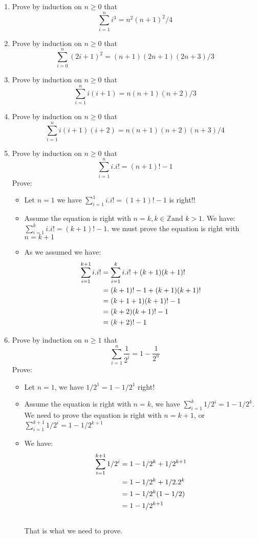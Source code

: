 \documentclass[11pt]{article}
\begin{document}
\begin {enumerate}
\item Prove by induction on $n \geq 0$ that $$\sum_{i=1}^n i^3 = n^2(n+1)^2/4$$
\item Prove by induction on $n \geq 0$ that $$\sum_{i=0}^n (2i+1)^2 =
  (n+1)(2n+1)(2n+3)/3$$
\item Prove by induction on $n \geq 0$ that $$\sum_{i=1}^ni(i+1) =
  n(n+1)(n+2)/3 $$
\item Prove by induction on $n \geq 0$ that $$
\sum_{i=1}^n i(i+1)(i+2) = n(n+1)(n+2)(n+3)/4$$

\item Prove by induction on $n \geq 0$ that $$
\sum_{i=1}^ni.i! = (n+1)! -1
$$
Prove:
\begin{itemize}
\item  Let $n = 1$ we have $\sum_{i=1}^1i.i! = (1+1)!-1$ is right!!
\item Assume the equation is right with $n=k, k\in \mathbb{Z} \mbox{
    and } k >1$. We have: $\sum_{i=1}^k i.i! = (k+1)!-1$. we must prove the equation is right with $n = k+1$
\item As we assumed we have:
\begin{align}
\sum_{i=1}^{k+1}i.i! &= \sum_{i=1}^{k}i.i! + (k+1)(k+1)! \\ \notag
&= (k+1)! -1 + (k+1)(k+1)!\\ \notag
&= (k+1+1)(k+1)! - 1 \\ \notag
&= (k+2)(k+1)! - 1 \\ \notag
&= (k+2)! - 1 \notag
\end{align}
\end{itemize}

\item Prove by induction on $n \geq 1$ that $$
\sum_{i=1}^n\frac{1}{2^i} = 1 - \frac{1}{2^n}
$$
Prove: 
\begin{itemize}
\item Let $n = 1$, we have $1/2^1 = 1 - 1/2^1$ right!
\item Assume the equation is right with $n = k$, we have $\sum_{i=1}^k1/2^i = 1 - 1/2^k$. We need to prove the equation is right with $n = k+1$, or $\sum_{i=1}^{k+1}1/2^i = 1 - 1/2^{k+1}$
\item We have:
\begin{align}
  \sum_{i=1}^{k+1}1/2^i &= 1 - 1/2^k + 1/2^{k+1} \\ \notag
  &= 1 - 1/2^k + 1/2.2^k \\ \notag
  &= 1 - 1/2^k(1-1/2) \\ \notag
  &= 1 - 1/2^{k+1} \\ \notag
\end{align}
That is what we need to prove.
\end{itemize}


\end{enumerate}
\end{document}
